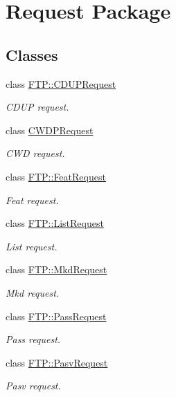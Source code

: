 \hypertarget{group__request}{}\section{Request Package}
\label{group__request}
\subsection*{Classes}
\begin{DoxyCompactItemize}
\item 
class \hyperlink{classFTP_1_1CDUPRequest}{F\+T\+P\+::\+C\+D\+U\+P\+Request}
\begin{DoxyCompactList}\small\item\em C\+D\+U\+P request. \end{DoxyCompactList}\item 
class \hyperlink{classCWDPRequest}{C\+W\+D\+P\+Request}
\begin{DoxyCompactList}\small\item\em C\+W\+D request. \end{DoxyCompactList}\item 
class \hyperlink{classFTP_1_1FeatRequest}{F\+T\+P\+::\+Feat\+Request}
\begin{DoxyCompactList}\small\item\em Feat request. \end{DoxyCompactList}\item 
class \hyperlink{classFTP_1_1ListRequest}{F\+T\+P\+::\+List\+Request}
\begin{DoxyCompactList}\small\item\em List request. \end{DoxyCompactList}\item 
class \hyperlink{classFTP_1_1MkdRequest}{F\+T\+P\+::\+Mkd\+Request}
\begin{DoxyCompactList}\small\item\em Mkd request. \end{DoxyCompactList}\item 
class \hyperlink{classFTP_1_1PassRequest}{F\+T\+P\+::\+Pass\+Request}
\begin{DoxyCompactList}\small\item\em Pass request. \end{DoxyCompactList}\item 
class \hyperlink{classFTP_1_1PasvRequest}{F\+T\+P\+::\+Pasv\+Request}
\begin{DoxyCompactList}\small\item\em Pasv request. \end{DoxyCompactList}\item 

\end{DoxyCompactItemize}
